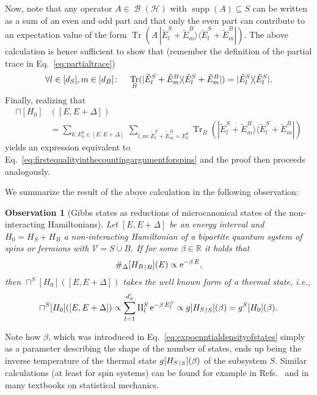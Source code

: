 \documentclass[a4paper,12pt,listof=totoc,index=totoc,bibliography=totoc,headsepline=false,headings=normal,BCOR16.153846mm,DIV12,headinclude,twoside,cleardoublepage=empty,numbers=noenddot,final]{scrreprt}
\theoremstyle{mystyle}
\numberwithin{equation}{section}
\numberwithin{figure}{section}
\numberwithin{lemma}{section}
\numberwithin{theorem}{section}
\numberwithin{corollary}{section}
\numberwithin{definition}{section}
\numberwithin{conjecture}{section}
\newtheorem{observation}{Observation}
\numberwithin{observation}{section}
\newcommand{\+}{\mkern2mu}
\newcommand{\dunion}{\mathbin{\dot{\cup}}}
\newcommand{\texteqref}[1]{Eq.~\eqref{#1}}
\newcommand{\suchthat}{\colon}
\newcommand{\itholds}{\colon\mathchoice{\quad}{}{}{}}
\renewcommand{\H}{H}
\newcommand{\rhog}{g}
\newcommand{\rhomc}{{\sqcap}}
\newcommand{\Vset}{\mathcal{V}}
\newcommand{\bra}[1]{\langle #1|}
\newcommand{\ket}[1]{|#1\rangle}
\newcommand{\ketbra}[2]{\ket{#1}\!\bra{#2}}
\newcommand{\trunc}[2]{{#1}_{\upharpoonright \mathnormal{#2}}}
\newcommand{\e}{\mathrm{e}}
\DeclareMathOperator{\1}{\mathds{1}}
\DeclareMathOperator{\Bop}{\mathcal{B}}
\DeclareMathOperator{\Tr}{Tr}
\DeclareMathOperator{\supp}{supp}
\newcommand{\mc}[1]{\mathcal{#1}}
\newcommand{\mcH}{\mc{H}}
\newcommand{\mb}[1]{\mathbb{#1}}
\newcommand{\R}{\mb{R}}
\begin{document}
Now, note that any operator $A \in \Bop(\mcH)$ with $\supp(A) \subseteq S$ can be written as a sum of an even and odd part and that only the even part can contribute to an expectation value of the form $\Tr(A\,\ketbra{\tilde E^S_l + \tilde E^B_m}{\tilde E^S_l + \tilde E^B_m})$.
The above calculation is hence sufficient to show that (remember the definition of the partial trace in \texteqref{eq:partialtrace})
\begin{equation}
  \forall l\in[d_S],m\in[d_B]\itholds \Tr_B(\ketbra{\tilde E^S_l + \tilde E^B_m}{\tilde E^S_l + \tilde E^B_m}) = \ketbra{\tilde E^S_l}{\tilde E^S_l} .
\end{equation}
Finally, realizing that
\begin{equation}
  \begin{split}
    \rhomc[\H_0]&([E,E+\Delta])\\
    &= \sum_{k\suchthat E^0_k \in [E,E+\Delta]}\ \sum_{l,m\suchthat \tilde E^S_l+\tilde E^B_m=E^0_k} \Tr_B(\ketbra{\tilde E^S_l + \tilde E^B_m}{\tilde E^S_l + \tilde E^B_m})
  \end{split}
\end{equation}
yields an expression equivalent to \texteqref{eq:firstequalityinthecountingargumentforspins} and the proof then proceeds analogously.

We summarize the result of the above calculation in the following observation:
\begin{observation}[Gibbs states as reductions of microcanonical states of the non-interacting Hamiltonians] \label{obs:gibbsstatesasreductionsofmicrocanonicalstates}
  Let $[E,E+\Delta]$ be an energy interval and $\H_0 = \H_S + \H_B$ a non-interacting Hamiltonian of a bipartite quantum system of spins or fermions with $\Vset = S \dunion B$. If for some $\beta \in \R$ it holds that
  \begin{equation} \label{eq:expoenntialdensityofstates}
    \#_\Delta[\trunc{\H_B}B](E) \propto \e^{-\beta\,E} ,
  \end{equation}
  then $\rhomc^S[\H_0]([E,E+\Delta])$ takes the well known form of a thermal state, i.e.,
  \begin{equation} \label{eq:noninteractingreducedmicrocanonicalstateisequaltocanonicalstate}
    \rhomc^S[\H_0]([E,E+\Delta]) \propto \sum_{l=1}^{d_S'} \Pi^S_l \, \e^{-\beta\,E^S_l} \propto \rhog[\trunc{\H_S}S](\beta) = \rhog^S[\H_0](\beta).
  \end{equation}
\end{observation}

Note how $\beta$, which was introduced in \texteqref{eq:expoenntialdensityofstates} simply as a parameter describing the shape of the number of states, ends up being the inverse temperature of the thermal state $\rhog[\trunc{\H_S}S](\beta)$ of the subsystem $S$.
Similar calculations (at least for spin systems) can be found for example in Refs.~\cite{Goldstein06,tasaki98,Reimann07,Gemmer09} and in many textbooks on statistical mechanics.
\end{document}
